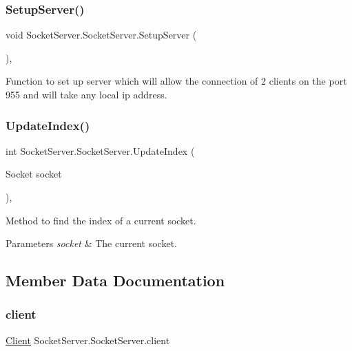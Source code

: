 \subsubsection{\texorpdfstring{Setup\+Server()}{SetupServer()}}
{\footnotesize\ttfamily void Socket\+Server.\+Socket\+Server.\+Setup\+Server (\begin{DoxyParamCaption}{ }\end{DoxyParamCaption})\hspace{0.3cm}{\ttfamily [inline]}, {\ttfamily [private]}}

Function to set up server which will allow the connection of 2 clients on the port 955 and will take any local ip address. \mbox{\label{class_socket_server_1_1_socket_server_a927514acb2fcf8804b360ad07b677a53}} 
\subsubsection{\texorpdfstring{Update\+Index()}{UpdateIndex()}}
{\footnotesize\ttfamily int Socket\+Server.\+Socket\+Server.\+Update\+Index (\begin{DoxyParamCaption}\item[{Socket}]{socket }\end{DoxyParamCaption})\hspace{0.3cm}{\ttfamily [inline]}, {\ttfamily [private]}}

Method to find the index of a current socket. 
\begin{DoxyParams}{Parameters}
{\em socket} & The current socket. \\
\hline
\end{DoxyParams}


\subsection{Member Data Documentation}
\mbox{\label{class_socket_server_1_1_socket_server_a2c56e560fbab349d4ed56524f1f52f9c}} 
\subsubsection{\texorpdfstring{client}{client}}
{\footnotesize\ttfamily \hyperlink{class_socket_server_1_1_client}{Client} Socket\+Server.\+Socket\+Server.\+client\hspace{0.3cm}{\ttfamily [private]}}



